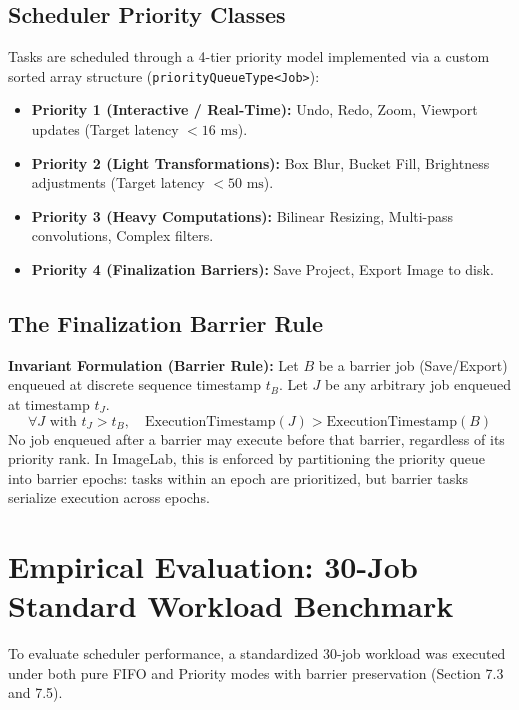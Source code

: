 \documentclass[10pt,a4paper]{article}
\begin{document}
\subsection{Scheduler Priority Classes}
Tasks are scheduled through a 4-tier priority model implemented via a custom sorted array structure (\texttt{priorityQueueType<Job>}):
\begin{itemize}
    \item \textbf{Priority 1 (Interactive / Real-Time):} Undo, Redo, Zoom, Viewport updates (Target latency $< 16 \text{ ms}$).
    \item \textbf{Priority 2 (Light Transformations):} Box Blur, Bucket Fill, Brightness adjustments (Target latency $< 50 \text{ ms}$).
    \item \textbf{Priority 3 (Heavy Computations):} Bilinear Resizing, Multi-pass convolutions, Complex filters.
    \item \textbf{Priority 4 (Finalization Barriers):} Save Project, Export Image to disk.
\end{itemize}

\subsection{The Finalization Barrier Rule}
\textbf{Invariant Formulation (Barrier Rule):}
Let $B$ be a barrier job (Save/Export) enqueued at discrete sequence timestamp $t_B$. Let $J$ be any arbitrary job enqueued at timestamp $t_J$.
$$\forall J \text{ with } t_J > t_B, \quad \text{ExecutionTimestamp}(J) > \text{ExecutionTimestamp}(B)$$
No job enqueued after a barrier may execute before that barrier, regardless of its priority rank. In ImageLab, this is enforced by partitioning the priority queue into barrier epochs: tasks within an epoch are prioritized, but barrier tasks serialize execution across epochs.

\section{Empirical Evaluation: 30-Job Standard Workload Benchmark}
To evaluate scheduler performance, a standardized 30-job workload was executed under both pure FIFO and Priority modes with barrier preservation (Section 7.3 and 7.5).
\end{document}
